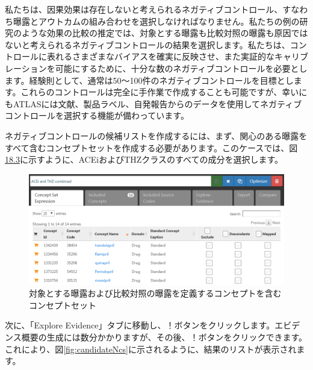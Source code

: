 \documentclass[
  11pt]{book}
\theoremstyle{definition}
\theoremstyle{definition}
\theoremstyle{definition}
\theoremstyle{definition}
\theoremstyle{remark}
\begin{document}
私たちは、因果効果は存在しないと考えられるネガティブコントロール、すなわち曝露とアウトカムの組み合わせを選択しなければなりません。私たちの例の研究のような効果の比較の推定では、対象とする曝露も比較対照の曝露も原因ではないと考えられるネガティブコントロールの結果を選択します。私たちは、コントロールに表れるさまざまなバイアスを確実に反映させ、また実証的なキャリブレーションを可能にするために、十分な数のネガティブコントロールを必要とします。経験則として、通常は50～100件のネガティブコントロールを目標とします。これらのコントロールは完全に手作業で作成することも可能ですが、幸いにもATLASには文献、製品ラベル、自発報告からのデータを使用してネガティブコントロールを選択する機能が備わっています。

ネガティブコントロールの候補リストを作成するには、まず、関心のある曝露をすべて含むコンセプトセットを作成する必要があります。このケースでは、図\href{https://ohdsi.github.io/TheBookOfOhdsi/MethodValidity.html\#fig:exposuresConceptSet}{18.3}に示すように、ACEiおよびTHZクラスのすべての成分を選択します。

\begin{figure}

{\centering \includegraphics[width=1\linewidth]{images/MethodValidity/exposuresConceptSet} 

}

\caption{対象とする曝露および比較対照の曝露を定義するコンセプトを含むコンセプトセット}\label{fig:exposuresConceptSet}
\end{figure}

次に、「Explore Evidence」タブに移動し、！\href{images/MethodValidity/generate.png}{}ボタンをクリックします。エビデンス概要の生成には数分かかりますが、その後、！\href{images/MethodValidity/viewEvidence.png}{}ボタンをクリックできます。これにより、図\ref{fig:candidateNcs}に示されるように、結果のリストが表示されます。
\end{document}
